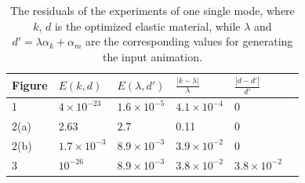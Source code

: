 \documentclass[twocolumn,a4paper]{article}
\begin{document}
\begin{center}
  \begin{table}[ht]
    {\tiny
      \begin{tabular}{ | l | l | l | l | l| l|}
        \hline
        Figure&$E(k,d)$&$E(\lambda,d')$&$\frac{|k-\lambda|}{\lambda}$&$\frac{|d-d'|}{d'}$\\ \hline
        1&$4\times 10^{-23}$&$1.6\times10^{-5}$&$4.1\times 10^{-4}$&0  \\ \hline
        2(a)&2.63&$2.7$&0.11& 0 \\ \hline
        2(b)&$1.7\times 10^{-3}$&$8.9\times 10^{-3}$&$3.9\times 10^{-2}$& 0 \\
        \hline
        3&$10^{-26}$&$8.9\times 10^{-3}$&$3.8\times 10^{-2}$&$3.8\times 10^{-2}$\\ \hline
      \end{tabular}
}
\caption{The residuals of the experiments of one single mode, where $k$, $d$ is
  the optimized elastic material, while $\lambda$ and
  $d'=\lambda\alpha_k+\alpha_m$ are the corresponding values for generating
  the input animation.} 
\label{residual}
\end{table}
\end{center}
\end{document}
